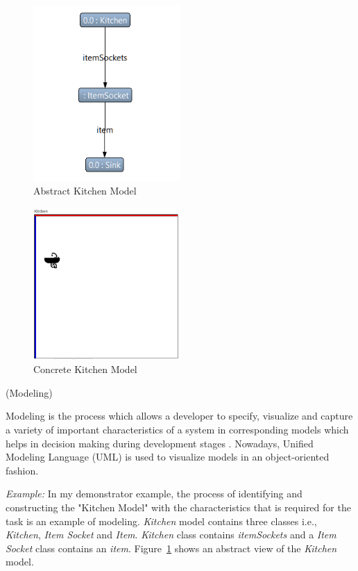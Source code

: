 \begin{figure}
	\includegraphics[width=0.5\textwidth]{figures/KitchenModel_Abstract}
	\caption{Abstract Kitchen Model}
	\label{fig:Abstract_KitchenModel}
\end{figure}

\begin{figure}
	\includegraphics[width=0.5\textwidth]{figures/Kitchen_Concrete}
	\caption{Concrete Kitchen Model}
	\label{fig:Concrete_KitchenModel}
\end{figure}

\begin{defn}\label{defModeling} (Modeling) \end{defn}
Modeling is the process which allows a developer to specify, visualize and capture a variety of important characteristics of a system in corresponding models which helps in decision making during development stages \cite{uml}. Nowadays, Unified Modeling Language (UML) \cite{uml} is used to visualize models in an object-oriented fashion.

\textit{Example:} In my demonstrator example, the process of identifying and constructing the "Kitchen Model" with the characteristics that is required for the task is an example of modeling. \textit{Kitchen} model contains three classes i.e., \textit{Kitchen}, \textit{Item Socket} and \textit{Item}. \textit{Kitchen} class contains \textit{itemSockets} and a \textit{Item Socket} class contains an \textit{item}. Figure~\ref{fig:Abstract_KitchenModel} shows an abstract view of the \textit{Kitchen} model.\\ 

